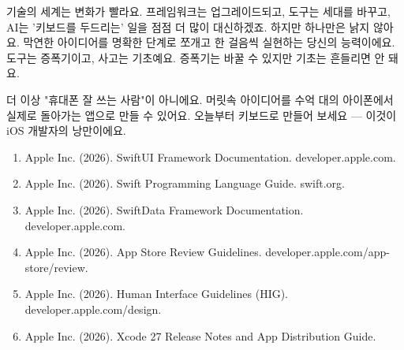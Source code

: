 기술의 세계는 변화가 빨라요. 프레임워크는 업그레이드되고, 도구는 세대를 바꾸고, AI는 '키보드를 두드리는' 일을 점점 더 많이 대신하겠죠. 하지만 하나만은 낡지 않아요. 막연한 아이디어를 명확한 단계로 쪼개고 한 걸음씩 실현하는 당신의 능력이에요. 도구는 증폭기이고, 사고는 기초예요. 증폭기는 바꿀 수 있지만 기초는 흔들리면 안 돼요.

더 이상 "휴대폰 잘 쓰는 사람"이 아니에요. 머릿속 아이디어를 수억 대의 아이폰에서 실제로 돌아가는 앱으로 만들 수 있어요. 오늘부터 키보드로 만들어 보세요 — 이것이 iOS 개발자의 낭만이에요.


\begin{enumerate}
  \item Apple Inc. (2026). SwiftUI Framework Documentation. developer.apple.com.
  \item Apple Inc. (2026). Swift Programming Language Guide. swift.org.
  \item Apple Inc. (2026). SwiftData Framework Documentation. developer.apple.com.
  \item Apple Inc. (2026). App Store Review Guidelines. developer.apple.com/app-store/review.
  \item Apple Inc. (2026). Human Interface Guidelines (HIG). developer.apple.com/design.
  \item Apple Inc. (2026). Xcode 27 Release Notes and App Distribution Guide.
\end{enumerate}
